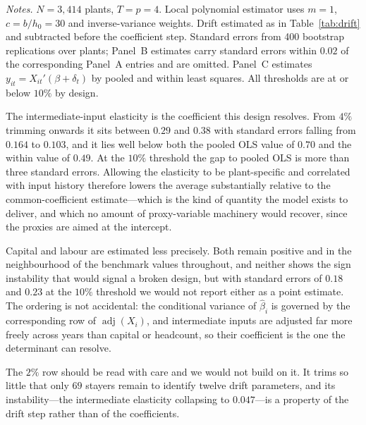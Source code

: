 \begin{table}[t]
\vspace{0.6em}
\begin{minipage}{0.92\textwidth}
\footnotesize \emph{Notes.} $N = 3{,}414$ plants, $T = p = 4$. Local polynomial
estimator uses $m = 1$, $c = b/h_0 = 30$ and inverse-variance weights. Drift
estimated as in Table~\ref{tab:drift} and subtracted before the coefficient
step. Standard errors from 400 bootstrap replications over plants; Panel~B
estimates carry standard errors within $0.02$ of the corresponding Panel~A
entries and are omitted. Panel~C estimates
$y_{it} = X_{it}'(\beta + \delta_t)$ by pooled and within least squares. All
thresholds are at or below $10\%$ by design.
\end{minipage}
\end{table}

The intermediate-input elasticity is the coefficient this design resolves. From
$4\%$ trimming onwards it sits between $0.29$ and $0.38$ with standard errors
falling from $0.164$ to $0.103$, and it lies well below both the pooled OLS
value of $0.70$ and the within value of $0.49$. At the $10\%$ threshold the gap
to pooled OLS is more than three standard errors. Allowing the elasticity to be
plant-specific and correlated with input history therefore lowers the average
substantially relative to the common-coefficient estimate---which is the kind
of quantity the model exists to deliver, and which no amount of proxy-variable
machinery would recover, since the proxies are aimed at the intercept.

Capital and labour are estimated less precisely. Both remain positive and in
the neighbourhood of the benchmark values throughout, and neither shows the
sign instability that would signal a broken design, but with standard errors of
$0.18$ and $0.23$ at the $10\%$ threshold we would not report either as a point
estimate. The ordering is not accidental: the conditional variance of
$\hat\beta_i$ is governed by the corresponding row of
$\operatorname{adj}(X_i)$, and intermediate inputs are adjusted far more freely
across years than capital or headcount, so their coefficient is the one the
determinant can resolve.

The $2\%$ row should be read with care and we would not build on it. It trims
so little that only $69$ stayers remain to identify twelve drift parameters,
and its instability---the intermediate elasticity collapsing to $0.047$---is
a property of the drift step rather than of the coefficients.

